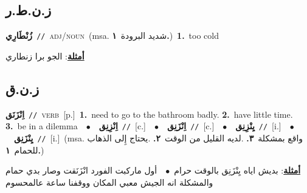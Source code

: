 \documentclass[10pt,a4paper,twoside]{article} %
\begin{document}
\begin{multicols}{2}
\vspace{-3mm}
\subsection*{\color{blue}\foreignlanguage{arabic}{ز.ن.ط.ر}\color{blue}{ (ntws)}} 

{\setlength\topsep{0pt}\textbf{\foreignlanguage{arabic}{زُنْطَارِي}}\ {\color{gray}\texttt{//}\color{black}}\ \textsc{adj/noun}\ \color{gray}(msa. \foreignlanguage{arabic}{شديد البرودة}~\foreignlanguage{arabic}{\textbf{١.}})\color{black}\ \textbf{1.}~too cold\  \begin{flushright}\color{gray}\foreignlanguage{arabic}{\textbf{\underline{\foreignlanguage{arabic}{أمثلة}}}: الجو برا زنطاري}\end{flushright}\color{black}} \vspace{2mm}

\vspace{-3mm}
\subsection*{\color{blue}\foreignlanguage{arabic}{ز.ن.ق}\color{blue}{}} 

{\setlength\topsep{0pt}\textbf{\foreignlanguage{arabic}{اِنْزَنَق}}\ {\color{gray}\texttt{//}\color{black}}\ \textsc{verb}\ [p.]\ \textbf{1.}~need to go to the bathroom badly.  \textbf{2.}~have little time.  \textbf{3.}~be in a dilemma\ \ $\bullet$\ \ \setlength\topsep{0pt}\textbf{\foreignlanguage{arabic}{اِنْزِنِق}}\ {\color{gray}\texttt{//}\color{black}}\ [c.]\ \ $\bullet$\ \ \setlength\topsep{0pt}\textbf{\foreignlanguage{arabic}{اِنْزَنِق}}\ {\color{gray}\texttt{//}\color{black}}\ [c.]\ \ $\bullet$\ \ \setlength\topsep{0pt}\textbf{\foreignlanguage{arabic}{يِنْزِنِق}}\ {\color{gray}\texttt{//}\color{black}}\ [i.]\ \ $\bullet$\ \ \setlength\topsep{0pt}\textbf{\foreignlanguage{arabic}{يِنْزَنِق}}\ {\color{gray}\texttt{//}\color{black}}\ [i.]\ \color{gray}(msa. \foreignlanguage{arabic}{واقع بمشكلة}~\foreignlanguage{arabic}{\textbf{٣.}}  .\foreignlanguage{arabic}{لديه القليل من الوقت}~\foreignlanguage{arabic}{\textbf{٢.}}  .\foreignlanguage{arabic}{يحتاج إِلى الذهاب للحمام}~\foreignlanguage{arabic}{\textbf{١.}})\color{black}\  \begin{flushright}\color{gray}\foreignlanguage{arabic}{\textbf{\underline{\foreignlanguage{arabic}{أمثلة}}}: بديش اياه يِنْزَنِق بالوقت حرام\ $\bullet$\ \  أول ماركبت الفورد انْزَنَقت وصار بدي حمام والمشكلة انه الجيش معبي المكان ووقفنا ساعة عالمحسوم}\end{flushright}\color{black}} \vspace{2mm}


\end{multicols}
\end{document}
